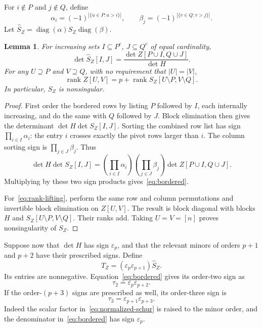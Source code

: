 \documentclass[11pt]{article}
\newtheorem{lemma}[theorem]{Lemma}
\theoremstyle{definition}
\theoremstyle{remark}
\numberwithin{equation}{section}
\newcommand{\eps}{\varepsilon}
\DeclareMathOperator{\rank}{rank}
\DeclareMathOperator{\diag}{diag}
\begin{document}
For $i\notin P$ and $j\notin Q$, define
\begin{equation}\label{eq:ordering-signs}
 \alpha_i=(-1)^{|\{u\in P:u>i\}|},\qquad
 \beta_j=(-1)^{|\{v\in Q:v>j\}|}.
\end{equation}
Let $\widehat S_Z=\diag(\alpha)S_Z\diag(\beta)$.

\begin{lemma}\label{lem:schur}
For increasing sets $I\subseteq P^c$, $J\subseteq Q^c$ of equal
cardinality,
\begin{equation}\label{eq:bordered}
 \det\widehat S_Z[I,J]
   =\frac{\det Z[P\cup I,Q\cup J]}{\det H}.
\end{equation}
For any $U\supseteq P$ and $V\supseteq Q$, with no requirement
that $|U|=|V|$,
\begin{equation}\label{eq:rank-lifting}
 \rank Z[U,V]
   =p+\rank S_Z[U\setminus P,V\setminus Q].
\end{equation}
In particular, $S_Z$ is nonsingular.
\end{lemma}

\begin{proof}
First order the bordered rows by listing $P$ followed by $I$, each
internally increasing, and do the same with $Q$ followed by $J$.
Block elimination then gives the determinant
$\det H\det S_Z[I,J]$. Sorting the combined row list has sign
$\prod_{i\in I}\alpha_i$: the entry $i$ crosses exactly the pivot
rows larger than $i$. The column sorting sign is
$\prod_{j\in J}\beta_j$. Thus
\[
 \det H\det S_Z[I,J]
 =\left(\prod_{i\in I}\alpha_i\right)
  \left(\prod_{j\in J}\beta_j\right)
  \det Z[P\cup I,Q\cup J].
\]
Multiplying by these two sign products gives~\eqref{eq:bordered}.

For~\eqref{eq:rank-lifting}, perform the same row and column
permutations and invertible block elimination on $Z[U,V]$.
The result is block diagonal with blocks $H$ and
$S_Z[U\setminus P,V\setminus Q]$. Their ranks add. Taking $U=V=[n]$
proves nonsingularity of $S_Z$.
\end{proof}

Suppose now that $\det H$ has sign $\eps_p$, and that the relevant
minors of orders $p+1$ and $p+2$ have their prescribed signs.
Define
\begin{equation}\label{eq:normalized-schur}
 T_Z=(\eps_p\eps_{p+1})\widehat S_Z.
\end{equation}
Its entries are nonnegative. Equation~\eqref{eq:bordered} gives its
order-two sign as
\[
 \tau_2=\eps_p\eps_{p+2}.
\]
If the order-$(p+3)$ signs are prescribed as well, its order-three
sign is
\[
 \tau_3=\eps_{p+1}\eps_{p+3}.
\]
Indeed the scalar factor in~\eqref{eq:normalized-schur} is raised
to the minor order, and the denominator in~\eqref{eq:bordered}
has sign $\eps_p$.
\end{document}

